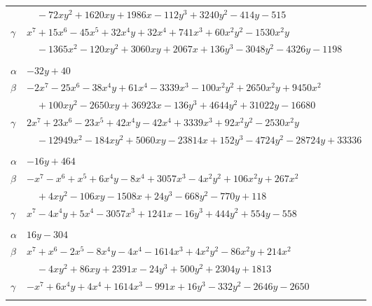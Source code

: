 \documentclass[11pt]{article}
\begin{document}
\begin{longtable}{@{}ll@{}}
 & $\quad -72xy^{2}+1620xy+1986x-112y^{3}+3240y^{2}-414y-515$\\
$\gamma$ & $x^{7}+15x^{6}-45x^{5}+32x^{4}y+32x^{4}+741x^{3}+60x^{2}y^{2}-1530x^{2}y$\\
 & $\quad -1365x^{2}-120xy^{2}+3060xy+2067x+136y^{3}-3048y^{2}-4326y-1198$\\
\addlinespace[3pt]
\multicolumn{2}{@{}l}{$\{i,j\}=\{103,105\}$, $k_{ij}=2^{6}$}\\
$\alpha$ & $-32y+40$\\
$\beta$ & $-2x^{7}-25x^{6}-38x^{4}y+61x^{4}-3339x^{3}-100x^{2}y^{2}+2650x^{2}y+9450x^{2}$\\
 & $\quad +100xy^{2}-2650xy+36923x-136y^{3}+4644y^{2}+31022y-16680$\\
$\gamma$ & $2x^{7}+23x^{6}-23x^{5}+42x^{4}y-42x^{4}+3339x^{3}+92x^{2}y^{2}-2530x^{2}y$\\
 & $\quad -12949x^{2}-184xy^{2}+5060xy-23814x+152y^{3}-4724y^{2}-28724y+33336$\\
\addlinespace[3pt]
\multicolumn{2}{@{}l}{$\{i,j\}=\{103,108\}$, $k_{ij}=2^{6}\cdot 3\cdot 7$}\\
$\alpha$ & $-16y+464$\\
$\beta$ & $-x^{7}-x^{6}+x^{5}+6x^{4}y-8x^{4}+3057x^{3}-4x^{2}y^{2}+106x^{2}y+267x^{2}$\\
 & $\quad +4xy^{2}-106xy-1508x+24y^{3}-668y^{2}-770y+118$\\
$\gamma$ & $x^{7}-4x^{4}y+5x^{4}-3057x^{3}+1241x-16y^{3}+444y^{2}+554y-558$\\
\addlinespace[3pt]
\multicolumn{2}{@{}l}{$\{i,j\}=\{104,106\}$, $k_{ij}=2^{5}\cdot 3\cdot 7$}\\
$\alpha$ & $16y-304$\\
$\beta$ & $x^{7}+x^{6}-2x^{5}-8x^{4}y-4x^{4}-1614x^{3}+4x^{2}y^{2}-86x^{2}y+214x^{2}$\\
 & $\quad -4xy^{2}+86xy+2391x-24y^{3}+500y^{2}+2304y+1813$\\
$\gamma$ & $-x^{7}+6x^{4}y+4x^{4}+1614x^{3}-991x+16y^{3}-332y^{2}-2646y-2650$\\
\addlinespace[3pt]
\end{longtable}
\endgroup
\end{document}
